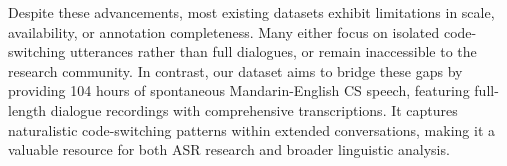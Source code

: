 Despite these advancements, most existing datasets exhibit limitations in scale, availability, or annotation completeness. Many either focus on isolated code-switching utterances rather than full dialogues, or remain inaccessible to the research community. In contrast, our dataset aims to bridge these gaps by providing 104 hours of spontaneous Mandarin-English CS speech, featuring full-length dialogue recordings with comprehensive transcriptions. It captures naturalistic code-switching patterns within extended conversations, making it a valuable resource for both ASR research and broader linguistic analysis.